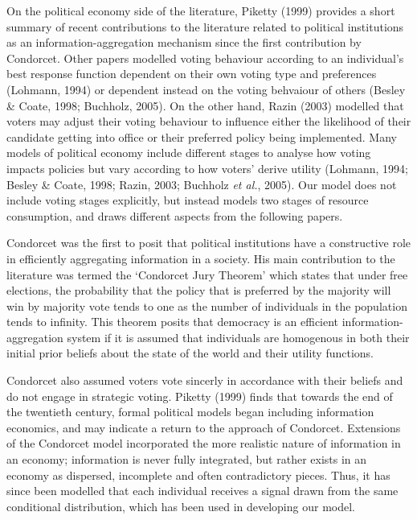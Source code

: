\documentclass[11pt,preprint, authoryear]{elsarticle}
\numberwithin{equation}{section}
\numberwithin{figure}{section}
\numberwithin{table}{section}
\begin{document}
On the political economy side of the literature, Piketty (1999) provides
a short summary of recent contributions to the literature related to
political institutions as an information-aggregation mechanism since the
first contribution by Condorcet. Other papers modelled voting behaviour
according to an individual's best response function dependent on their
own voting type and preferences (Lohmann, 1994) or dependent instead on
the voting behvaiour of others (Besley \& Coate, 1998; Buchholz, 2005).
On the other hand, Razin (2003) modelled that voters may adjust their
voting behaviour to influence either the likelihood of their candidate
getting into office or their preferred policy being implemented. Many
models of political economy include different stages to analyse how
voting impacts policies but vary according to how voters' derive utility
(Lohmann, 1994; Besley \& Coate, 1998; Razin, 2003; Buchholz \emph{et
al.}, 2005). Our model does not include voting stages explicitly, but
instead models two stages of resource consumption, and draws different
aspects from the following papers.

Condorcet was the first to posit that political institutions have a
constructive role in efficiently aggregating information in a society.
His main contribution to the literature was termed the `Condorcet Jury
Theorem' which states that under free elections, the probability that
the policy that is preferred by the majority will win by majority vote
tends to one as the number of individuals in the population tends to
infinity. This theorem posits that democracy is an efficient
information-aggregation system if it is assumed that individuals are
homogenous in both their initial prior beliefs about the state of the
world and their utility functions.

Condorcet also assumed voters vote sincerly in accordance with their
beliefs and do not engage in strategic voting. Piketty (1999) finds that
towards the end of the twentieth century, formal political models began
including information economics, and may indicate a return to the
approach of Condorcet. Extensions of the Condorcet model incorporated
the more realistic nature of information in an economy; information is
never fully integrated, but rather exists in an economy as dispersed,
incomplete and often contradictory pieces. Thus, it has since been
modelled that each individual receives a signal drawn from the same
conditional distribution, which has been used in developing our model.
\end{document}
